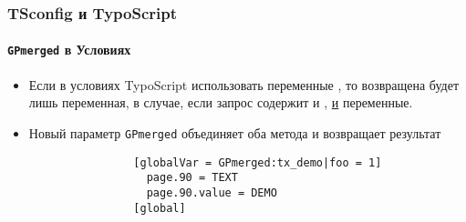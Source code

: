 
\begin{frame}[fragile]
	\frametitle{TSconfig и TypoScript}
	\framesubtitle{\texttt{GPmerged} в Условиях}

	\begin{itemize}

		\item Если в условиях TypoScript использовать переменные , то возвращена будет лишь 
			переменная, в случае, если запрос содержит и , \underline{и}
			 переменные.

		\item Новый параметр \texttt{GPmerged} объединяет оба метода и возвращает результат

			\begin{lstlisting}
				[globalVar = GPmerged:tx_demo|foo = 1]
				  page.90 = TEXT
				  page.90.value = DEMO
				[global]
			\end{lstlisting}

	\end{itemize}

\end{frame}


